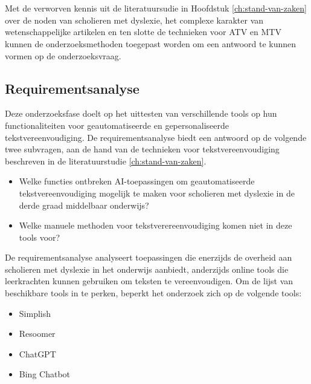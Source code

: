 
\chapter{}%
\label{ch:methodologie}

Met de verworven kennis uit de literatuursudie in Hoofdstuk \ref{ch:stand-van-zaken} over de noden van scholieren met dyslexie, het complexe karakter van wetenschappelijke artikelen en ten slotte de technieken voor ATV en MTV kunnen de onderzoeksmethoden toegepast worden om een antwoord te kunnen vormen op de onderzoeksvraag.

\section{Requirementsanalyse}
\label{sec:requirementsanalyse}

Deze onderzoeksfase doelt op het uittesten van verschillende tools op hun functionaliteiten voor geautomatiseerde en gepersonaliseerde tekstvereenvoudiging. De requirementsanalyse biedt een antwoord op de volgende twee subvragen, aan de hand van de technieken voor tekstvereenvoudiging beschreven in de literatuurstudie \ref{ch:stand-van-zaken}. 

\begin{itemize}
	\item Welke functies ontbreken AI-toepassingen om geautomatiseerde tekstvereenvoudiging mogelijk te maken voor scholieren met dyslexie in de derde graad middelbaar onderwijs?
	\item Welke manuele methoden voor tekstverereenvoudiging komen niet in deze tools voor?
\end{itemize}

De requirementsanalyse analyseert toepassingen die enerzijds de overheid aan scholieren met dyslexie in het onderwijs aanbiedt, anderzijds online tools die leerkrachten kunnen gebruiken om teksten te vereenvoudigen. Om de lijst van beschikbare tools in te perken, beperkt het onderzoek zich op de volgende tools:

\begin{itemize}
	\item Simplish
	\item Resoomer
	\item ChatGPT
	\item Bing Chatbot
\end{itemize}

